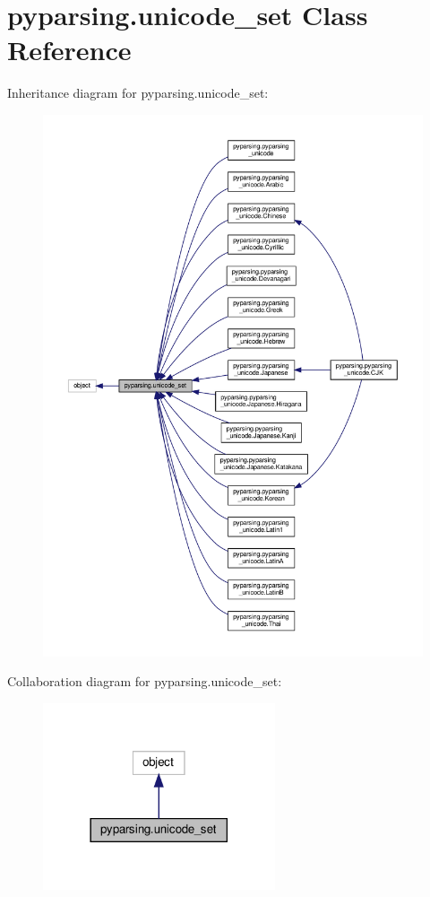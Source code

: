 \hypertarget{classpyparsing_1_1unicode__set}{}\section{pyparsing.\+unicode\+\_\+set Class Reference}
\label{classpyparsing_1_1unicode__set}


Inheritance diagram for pyparsing.\+unicode\+\_\+set\+:
\nopagebreak
\begin{figure}[H]
\begin{center}
\leavevmode
\includegraphics[width=350pt]{classpyparsing_1_1unicode__set__inherit__graph}
\end{center}
\end{figure}


Collaboration diagram for pyparsing.\+unicode\+\_\+set\+:
\nopagebreak
\begin{figure}[H]
\begin{center}
\leavevmode
\includegraphics[width=194pt]{classpyparsing_1_1unicode__set__coll__graph}
\end{center}
\end{figure}
